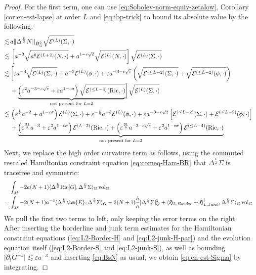 \documentclass[11pt,leqno,textwidth=10cm]{amsart}
\numberwithin{equation}{section}
\theoremstyle{definition}
\theoremstyle{plain}
\newcommand{\1}{\mathbbm{1}}
\newcommand{\E}{\mathcal{E}}
\newcommand{\Ric}{\text{\normalfont{Ric}}}
\newcommand{\vol}[1]{{\text{\normalfont{vol}}}_{#1}}
\renewcommand{\epsilon}{\varepsilon}
\newcommand{\del}{\partial}
\newcommand{\Lap}{\Delta}
\newcommand{\RE}{\bm{E}}
\begin{document}
\begin{proof}
For the first term, one can use \eqref{eq:Sobolev-norm-equiv-zetalow}, Corollary \ref{cor:en-est-lapse} at order $L$ and \eqref{eq:ibp-trick} to bound its absolute value by the following:
\begin{align*}
\lesssim&\,a\|\Lap^{\frac{L}2}N\|_{\dot{H}^2_G}\sqrt{\E^{(L)}(\Sigma,\cdot)}\\
\lesssim&\,\left[a^{-3}\sqrt{a^8\E^{(L+2)}(N,\cdot)}+a^{1-c\sqrt{\epsilon}}\sqrt{\E^{(L)}(N,\cdot)}\right]\sqrt{\E^{(L)}(\Sigma,\cdot)}\\
\lesssim&\,\biggr[\epsilon a^{-3}\sqrt{\E^{(L)}(\Sigma,\cdot)}+a^{-3}\E^{(L)}(\phi,\cdot)+\epsilon a^{-3-c\sqrt{\epsilon}}\left(\sqrt{\E^{(\leq L-2)}(\Sigma,\cdot)}+\sqrt{\E^{(\leq L-2)}(\phi,\cdot)}\right)\\
&\,+\underbrace{\left(\epsilon^2a^{-3-c\sqrt{\epsilon}}+\epsilon a^{1-c\sigma}\right)\sqrt{\E^{(\leq L-3)}(\Ric,\cdot)}}_{\text{not present for }L=2}\biggr]\sqrt{\E^{(L)}(\Sigma,\cdot)}\\
\lesssim&\,\left(\epsilon^\frac18 a^{-3}+a^{1-c\sigma}\right)\E^{(L)}(\Sigma,\cdot)+\epsilon^{-\frac18}a^{-3}\E^{(L)}(\phi,\cdot)+\epsilon a^{-3-c\sqrt{\epsilon}}\left[\E^{(\leq L-2)}(\Sigma,\cdot)+\E^{(\leq L-2)}(\phi,\cdot)\right]\\
&\,+\underbrace{\left(\epsilon^{\frac{31}8}a^{-3}+\epsilon^2 a^{1-c\sigma}\right)\E^{(L-2)}(\Ric,\cdot)+\left(\epsilon^\frac{31}8a^{-3-c\sqrt{\epsilon}}+\epsilon^2a^{1-c\sigma}\right)\E^{(\leq L-4)}(\Ric,\cdot)}_{\text{not present for }L=2}
\end{align*}
Next, we replace the high order curvature term as follows, using the commuted rescaled Hamiltonian constraint equation \eqref{eq:comeq-Ham-BR} that $\Lap^\frac{L}2\Sigma$ is tracefree and symmetric:
\begin{align*}
&\,\int_M-2a(N+1)\langle\Lap^{\frac{L}2}\Ric[G],\Lap^{\frac{L}2}\Sigma\rangle_G\,\vol{G}\\
=&\,\int_M-2(N+1)a^{-3}\langle\Lap^{\frac{L}2}\RE,\Lap^{\frac{L}2}\Sigma\rangle_G-2(N+1)\frac{\dot{a}}{a}|\Lap^{\frac{L}2}\Sigma|_G^2+\langle\mathfrak{H}_{L,Border}+\mathfrak{H}_{L,Junk}^\parallel,\Lap^{\frac{L}2}\Sigma\rangle_G\,\vol{G}
\end{align*}
We pull the first two terms to left, only keeping the error terms on the right. After inserting the borderline and junk term estimates for the Hamiltonian constraint equations (\eqref{eq:L2-Border-H} and \eqref{eq:L2-junk-H-par}) and the evolution equation itself (\eqref{eq:L2-Border-S} and \eqref{eq:L2-junk-S}), as well as bounding $\lvert\del_tG^{-1}\rvert\lesssim \epsilon a^{-3}$ and inserting \eqref{eq:BsN} as usual, we obtain \eqref{eq:en-est-Sigma} by integrating.
\end{proof}
\end{document}

